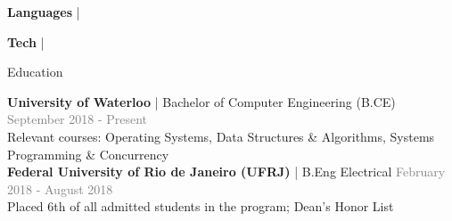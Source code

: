 \documentclass[hidelinks]{resume} %
\begin{document}
\begin{rSubsection}{\textbf{Languages} | }{}{}

\end{rSubsection}
\vspace{-.2cm}
\begin{rSubsection}{\textbf{Tech} | }{}{}

\end{rSubsection}

\vspace{-.20cm}

\begin{rSection}{Education}

{\textbf{University of Waterloo} {| Bachelor of Computer Engineering (B.CE)}} \hfill {\textcolor{gray}{September 2018 - Present}} 
\\ {Relevant courses: Operating Systems, Data Structures \& Algorithms, Systems Programming \& Concurrency}
\vspace{5px}
\\{\textbf{Federal University of Rio de Janeiro (UFRJ)}{ | B.Eng Electrical}} \hfill {\textcolor{gray}{February 2018 - August 2018}} 
\\ {Placed 6th of all admitted students in the program; Dean's Honor List}\hfill
\vspace{.1cm}
\end{rSection}

\vspace{-.20cm}
\end{document}
